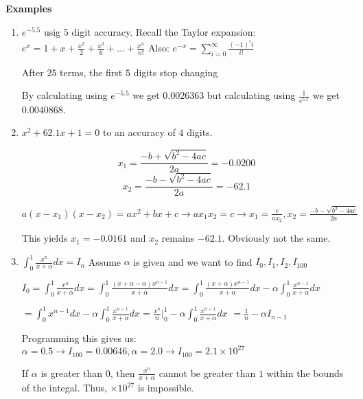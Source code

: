 \documentclass{article}
\begin{document}
\textbf{Examples}
\begin{enumerate}
	\item $e^{-5.5}$ usig $5$ digit accuracy.
		Recall the Taylor expansion:
		$e^x = 1 + x + \frac{x^2}{2} + \frac{x^3}{6}  + \dots + \frac{x^n}{n!}$
		Also:
		$e^{-x} = \sum_{i=0}^{\infty} \frac{(-1)^ii}{i!}$

		After $25$ terms, the first $5$ digits stop changing

		By calculating using $e^{-5.5}$ we get $0.0026363$ but calculating using $\frac{1}{e^{5.5}}$ we get $0.0040868$.

	\item $x^2 + 62.1x + 1 = 0$ to an accuracy of $4$ digits.

		$$x_1 = \frac{-b + \sqrt{b^2 - 4ac}}{2a} = -0.0200$$
		$$x_2 = \frac{-b - \sqrt{b^2 - 4ac}}{2a} = -62.1$$

		$a(x-x_1)(x-x_2) = ax^2+bx+c \rightarrow ax_1x_2 = c \rightarrow x_1 = \frac{c}{ax_2}, x_2 = \frac{-b - \sqrt{b^2 - 4ac}}{2a}$

		This yields $x_1 = -0.0161$ and $x_2$ remains $-62.1$. Obviously not the same.

	\item $\int_0^1 \frac{x^n}{x+ \alpha} dx = I_n$ Assume $\alpha$ is given and we want to find $I_0, I_1, I_2, I_100$

		$I_0 = \int_0^1 \frac{x^n}{x+ \alpha} dx  = \int_0^1 \frac{(x + \alpha - \alpha) x^{n-1}}{x+\alpha}dx = \int_0^1 \frac{(x + \alpha)x^{n-1}}{x + \alpha}dx - \alpha \int_0^1 \frac{x^{n-1}}{x + \alpha}dx$

		$= \int_0^1 x^{n-1} dx - \alpha \int_0^1 \frac{x^{n-1}}{x + \alpha}dx = \frac{x^n}n |_0^1 - \alpha \int_0^1 \frac{x^{n-1}}{x + \alpha}dx $ %
		$ = \frac{1}n - \alpha I_{n-1}$

		Programming this gives us:
		$\alpha = 0.5 \rightarrow I_{100} = 0.00646, \alpha = 2.0 \rightarrow I_{100} = 2.1 \times 10^{27}$

		If $\alpha$ is greater than $0$, then $\frac{x^n}{x + \alpha}$ cannot be greater than $1$ within the bounds of the integal. Thus, $\times 10^{27}$ is impossible.

\end{enumerate}
\end{document}
